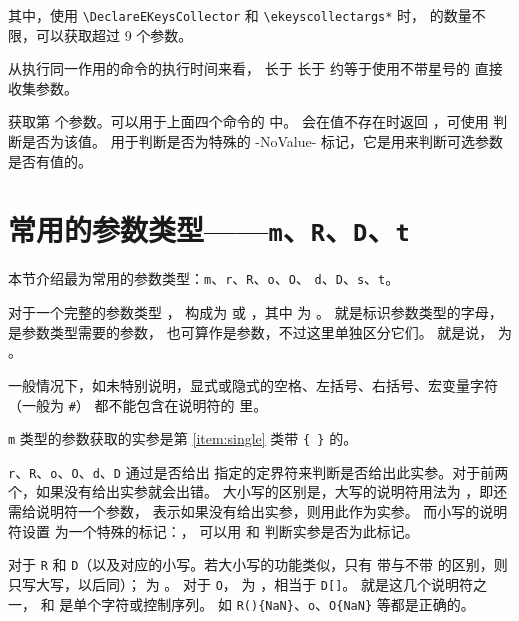 \documentclass[openany]{book}
\begin{document}
其中，使用 \verb|\DeclareEKeysCollector| 和 \verb|\ekeyscollectargs*| 时，
 的数量不限，可以获取超过 9 个参数。

从执行同一作用的命令的执行时间来看， 长于  
长于  约等于使用不带星号的  直接收集参数。

\begin{syntax}
\V\ekeyscollectorarg {}
\end{syntax}
获取第  个参数。可以用于上面四个命令的  中。
会在值不存在时返回 ，可使用  判断是否为该值。
 用于判断是否为特殊的 -NoValue- 标记，它是用来判断可选参数是否有值的。

\section{常用的参数类型——\texttt m、\texttt R、\texttt D、\texttt t}\label{sec:fq-used}

本节介绍最为常用的参数类型：\texttt m、\texttt r、\texttt R、\texttt o、\texttt O、
\texttt d、\texttt D、\texttt s、\texttt t。

对于一个完整的参数类型 ，
构成为  或 ，其中  为
。 就是标识参数类型的字母，
 是参数类型需要的参数， 也可算作是参数，不过这里单独区分它们。
就是说， 为 。

一般情况下，如未特别说明，显式或隐式的空格、左括号、右括号、宏变量字符（一般为 \verb|#|）
都不能包含在说明符的  里。

\texttt m 类型的参数获取的实参是第 \ref{item:single} 类带 \verb|{ }| 的。

\texttt r、\texttt R、\texttt o、\texttt O、\texttt d、\texttt D 通过是否给出
指定的定界符来判断是否给出此实参。对于前两个，如果没有给出实参就会出错。
大小写的区别是，大写的说明符用法为 ，即还需给说明符一个参数，
表示如果没有给出实参，则用此作为实参。
而小写的说明符设置  为一个特殊的标记：，
可以用  和  判断实参是否为此标记。

对于 \texttt R 和 \texttt D（以及对应的小写。若大小写的功能类似，只有
带与不带  的区别，则只写大写，以后同）； 为
。
对于 \texttt O， 为 ，相当于 \verb|D[]|。
 就是这几个说明符之一，
 和  是单个字符或控制序列。
如 \verb|R(){NaN}|、\verb|o|、\verb|O{NaN}| 等都是正确的。
\end{document}
